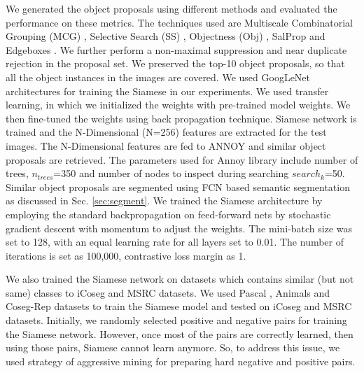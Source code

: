 \documentclass[conference]{IEEEtran}
\begin{document}
\begin{figure}[hbtp]
\end{figure}
We generated the object proposals using different methods and evaluated the performance on these metrics. The techniques used are Multiscale Combinatorial Grouping (MCG) \cite{pont2017multiscale}, Selective Search (SS) \cite{uijlings2013selective}, Objectness (Obj) \cite{alexe2012measuring}, SalProp \cite{mukherjee2017salprop} and Edgeboxes \cite{zitnick2014edge}. We further perform a non-maximal suppression and near duplicate rejection in the proposal set. We preserved the top-10 object proposals, so that all the object instances in the images are covered. We used GoogLeNet architectures \cite{szegedy2015going} for training the Siamese in our experiments. We used transfer learning, in which we initialized the weights with pre-trained model weights. We then fine-tuned the weights using back propagation technique. Siamese network is trained and the N-Dimensional (N=256) features are extracted for the test images. The N-Dimensional features are fed to ANNOY and similar object proposals are retrieved. The parameters used for Annoy library include number of trees, $ n_{trees}$=350 and number of nodes to inspect during searching $search_k$=50. Similar object proposals are segmented using FCN based semantic segmentation as discussed in Sec. \ref{sec:segment}. We trained the Siamese architecture by employing the standard backpropagation on feed-forward nets by stochastic gradient descent with momentum to adjust the weights. The mini-batch size was set to 128, with an equal learning rate for all layers set to 0.01. The number of iterations is set as 100,000, contrastive loss margin as 1. 

We also trained the Siamese network on datasets which contains similar (but not same) classes to iCoseg and MSRC datasets. We used Pascal \cite{everingham2010pascal}, Animals\cite{afkham2008joint} and Coseg-Rep \cite{dai2013cosegmentation} datasets to train the Siamese model and tested on iCoseg and MSRC datasets. Initially, we randomly selected positive and negative pairs for training the Siamese network. However, once most of the pairs are correctly learned, then using those pairs, Siamese cannot learn anymore. So, to address this issue, we used strategy of aggressive mining \cite{simo2015discriminative} for preparing hard negative and positive pairs. 
\end{document}
